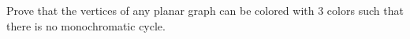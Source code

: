 Prove that the vertices of any planar graph can be colored with $3$ colors such that there is no monochromatic cycle.